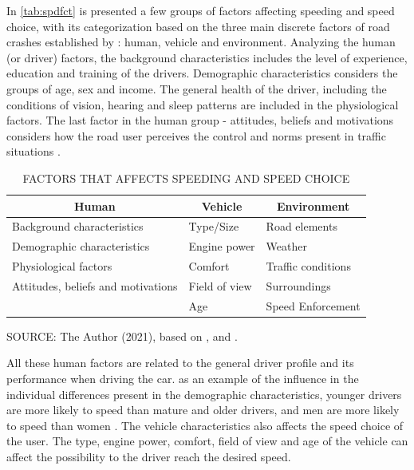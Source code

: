 In \autoref{tab:spdfct} is presented a few groups of factors affecting speeding and speed choice, with its categorization based on the three main discrete factors of road crashes established by \textcite{Haddon1980}: human, vehicle and environment. Analyzing the human (or driver) factors, the background characteristics includes the level of experience, education and training of the drivers. Demographic characteristics considers the groups of age, sex and income. The general health of the driver, including the conditions of vision, hearing and sleep patterns are included in the physiological factors. The last factor in the human group - attitudes, beliefs and motivations considers how the road user perceives the control and norms present in traffic situations \cite{Richard2013a}.  

\begin{table}[!hbtp]
    \footnotesize
    \captionsetup{justification=raggedright,
        singlelinecheck=false,
        font=footnotesize}
    \caption{FACTORS THAT AFFECTS SPEEDING AND SPEED CHOICE}
    \centering
    \begin{tabular}{lll}
    \hline
    \multicolumn{1}{c}{\textbf{Human}}                  & \multicolumn{1}{c}{\textbf{Vehicle}} & \multicolumn{1}{c}{\textbf{Environment}} \\ \hline
    Background characteristics      & Type/Size        & Road elements        \\
    Demographic characteristics     & Engine power     & Weather              \\
    Physiological factors           & Comfort          & Traffic conditions   \\
    Attitudes, beliefs and motivations & Field of view    & Surroundings    \\
                                    & Age              & Speed Enforcement    \\ \hline
\end{tabular}
    \label{tab:spdfct}
    \par \vspace{2mm} \footnotesize \raggedright
    SOURCE: The Author (2021), based on \textcite{Richard2013a}, \textcite{Shinar2017} and \textcite{WHO2008}.
\end{table}

All these human factors are related to the general driver profile and its performance when driving the car. as an example of the influence in the individual differences present in the demographic characteristics, younger drivers are more likely to speed than mature and older drivers, and men are more likely to speed than women \cite{Shinar2017}. The vehicle characteristics also affects the speed choice of the user. The type, engine power, comfort, field of view and age of the vehicle can affect the possibility to the driver reach the desired speed. 

